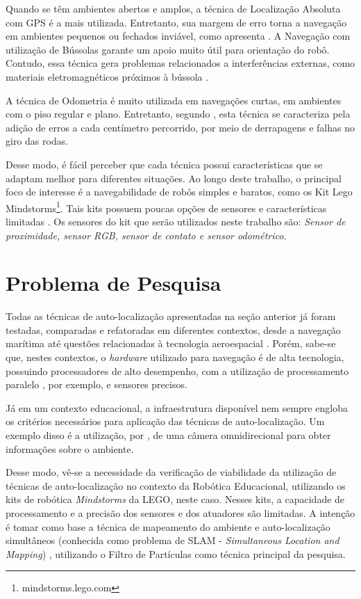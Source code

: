 	Quando se têm ambientes abertos e amplos, a técnica de Localização Absoluta com GPS é a mais utilizada. Entretanto, sua margem de erro torna a navegação em ambientes pequenos ou fechados inviável, como apresenta \cite{roboBulldozerIV}. A Navegação com utilização de Bússolas garante um apoio muito útil para orientação do robô. Contudo, essa técnica gera problemas relacionados a interferências externas, como materiais eletromagnéticos próximos à bússola \cite{roboBulldozerIV}.

	A técnica de Odometria é muito utilizada em navegações curtas, em ambientes com o piso regular e plano. Entretanto, segundo \cite{roboBulldozerIV}, esta técnica se caracteriza pela adição de erros a cada centímetro percorrido, por meio de derrapagens e falhas no giro das rodas.

	Desse modo, é fácil perceber que cada técnica possui características que se adaptam melhor para diferentes situações. Ao longo deste trabalho, o principal foco de interesse é a navegabilidade de robôs simples e baratos, como os Kit Lego Mindstorms\footnote{mindstorms.lego.com}. Tais kits possuem poucas opções de sensores e características limitadas \cite{drawLegoRobot}. Os sensores do kit que serão utilizados neste trabalho são: \textit{Sensor de proximidade, sensor RGB, sensor de contato e sensor odométrico}.

\section{Problema de Pesquisa}

	Todas as técnicas de auto-localização apresentadas na seção anterior já foram testadas, comparadas e refatoradas em diferentes contextos, desde a navegação marítima até questões relacionadas à tecnologia aeroespacial \cite{localizacaoEMapeamentoPaulo}. Porém, sabe-se que, nestes contextos, o \textit{hardware} utilizado para navegação é de alta tecnologia, possuindo processadores de alto desempenho, com a utilização de processamento paralelo \cite{processamentoParalelo}, por exemplo, e sensores precisos.

	Já em um contexto educacional, a infraestrutura disponível nem sempre engloba os critérios necessários para aplicação das técnicas de auto-localização. Um exemplo disso é a utilização, por \cite{localizacaoEMapeamentoPaulo}, de uma câmera omnidirecional para obter informações sobre o ambiente.

	Desse modo, vê-se a necessidade da verificação de viabilidade da utilização de técnicas de auto-localização no contexto da Robótica Educacional, utilizando os kits de robótica \textit{Mindstorms} da LEGO, neste caso. Nesses kits, a capacidade de processamento e a precisão dos sensores e dos atuadores são limitadas. A intenção é tomar como base a técnica de mapeamento do ambiente e auto-localização simultâneos (conhecida como problema de SLAM - \textit{Simultaneous Location and Mapping}) \cite{slamProblem}, utilizando o Filtro de Partículas como técnica principal da pesquisa.

